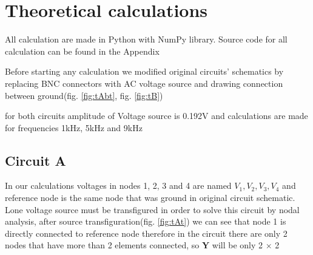 \documentclass[notitlepage, a4paper, 11pt]{article}
\begin{document}
	\section{Theoretical calculations}
	All calculation are made in Python with NumPy library. Source code for all calculation can be found in the Appendix
	
	Before starting any calculation we modified original circuits' schematics by replacing BNC connectors with AC voltage source and drawing connection between ground(fig. \ref{fig:tAbt}, fig. \ref{fig:tB})
	
	for both circuits amplitude of Voltage source is 0.192V and calculations are made for frequencies 1kHz, 5kHz and 9kHz 
	\subsection{Circuit A}
	In our calculations voltages in nodes 1, 2, 3 and 4 are named $V_1, V_2, V_3, V_4$ and reference node is the same node that was ground in original circuit schematic. Lone voltage source must be transfigured in order to solve this circuit by nodal analysis, after source transfiguration(fig. \ref{fig:tAt}) we can see that node 1 is directly connected to reference node therefore in the circuit there are only 2 nodes that have more than 2 elements connected, so $\mathbf{Y}$ will be only 2 $\times$ 2
	
\end{document}

